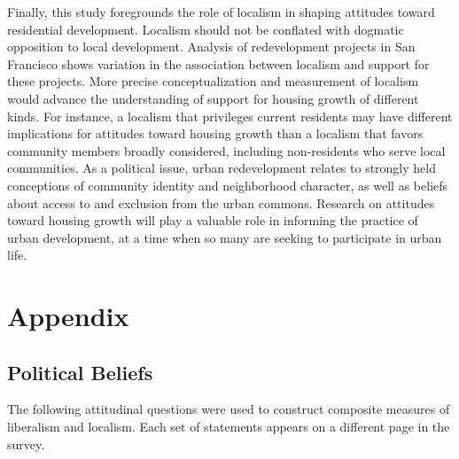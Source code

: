 \documentclass[article,11pt]{memoir}
\begin{document}
Finally, this study foregrounds the role of localism in shaping attitudes toward residential development. Localism should not be conflated with dogmatic opposition to local development. Analysis of redevelopment projects in San Francisco shows variation in the association between localism and support for these projects. More precise conceptualization and measurement of localism would advance the understanding of support for housing growth of different kinds. For instance, a localism that privileges current residents may have different implications for attitudes toward housing growth than a localism that favors community members broadly considered, including non-residents who serve local communities.  As a political issue, urban redevelopment relates to strongly held conceptions of community identity and neighborhood character, as well as beliefs about access to and exclusion from the urban commons.  Research on attitudes toward housing growth will play a valuable role in informing the practice of urban development, at a time when so many are seeking to participate in urban life.






\clearpage

\appendix
\renewcommand\thefigure{\thechapter.\arabic{figure}}    
\renewcommand\thetable{\thechapter.\arabic{table}}

\chapter*{Appendix}
\setcounter{chapter}{1}
\setcounter{figure}{0}
\setcounter{table}{0}

\section{Political Beliefs}\label{sec:e_political_beliefs}

The following attitudinal questions were used to construct composite measures of liberalism and localism.  Each set of statements appears on a different page in the survey.
\end{document}
